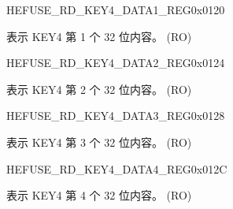 \begin{register}{H}{EFUSE\_RD\_KEY4\_DATA1\_REG}{0x0120}\label{regdesc:EFUSERDKEY4DATA1REG}
%
\regnewline%
\begin{regdesc}\begin{reglist}
\label{fielddesc:EFUSEKEY4DATA1}\item [EFUSE\_KEY4\_DATA1] 表示 KEY4 第 1 个 32 位内容。 (RO)
\end{reglist}\end{regdesc}
\end{register}


\begin{register}{H}{EFUSE\_RD\_KEY4\_DATA2\_REG}{0x0124}\label{regdesc:EFUSERDKEY4DATA2REG}
%
\regnewline%
\begin{regdesc}\begin{reglist}
\label{fielddesc:EFUSEKEY4DATA2}\item [EFUSE\_KEY4\_DATA2] 表示 KEY4 第 2 个 32 位内容。 (RO)
\end{reglist}\end{regdesc}
\end{register}


\begin{register}{H}{EFUSE\_RD\_KEY4\_DATA3\_REG}{0x0128}\label{regdesc:EFUSERDKEY4DATA3REG}
%
\regnewline%
\begin{regdesc}\begin{reglist}
\label{fielddesc:EFUSEKEY4DATA3}\item [EFUSE\_KEY4\_DATA3] 表示 KEY4 第 3 个 32 位内容。 (RO)
\end{reglist}\end{regdesc}
\end{register}


\begin{register}{H}{EFUSE\_RD\_KEY4\_DATA4\_REG}{0x012C}\label{regdesc:EFUSERDKEY4DATA4REG}
%
\regnewline%
\begin{regdesc}\begin{reglist}
\label{fielddesc:EFUSEKEY4DATA4}\item [EFUSE\_KEY4\_DATA4] 表示 KEY4 第 4 个 32 位内容。 (RO)
\end{reglist}\end{regdesc}
\end{register}


